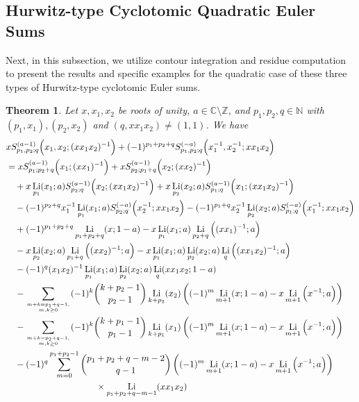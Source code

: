 \documentclass[11pt]{article}
\DeclareMathOperator{\Li}{Li}
\def\N{\mathbb{N}}
\def\Z{\mathbb{Z}}
\theoremstyle{plain}
\newtheorem{thm}{Theorem}[section]
\theoremstyle{definition}
\begin{document}
\subsection{Hurwitz-type Cyclotomic Quadratic Euler Sums}
Next, in this subsection, we utilize contour integration and residue computation to present the results and specific examples for the quadratic case of these three types of Hurwitz-type cyclotomic Euler sums.
\begin{thm}\label{thm-quadratic-CES-one} Let $x,x_1,x_2$ be roots of unity, $a\in \mathbb{C}\setminus \Z$, and $p_1,p_2,q\in\N$ with $(p_1,x_1), (p_2,x_2) $ and $ (q,xx_1x_2)\neq (1,1)$. We have
\begin{align}
&x S_{p_1,p_2;q}^{(a-1)}\Big(x_1,x_2;(xx_1x_2)^{-1}\Big)+(-1)^{p_1+p_2+q} S_{p_1,p_2;q}^{(-a)}\Big(x_1^{-1},x_2^{-1};xx_1x_2\Big)\nonumber\\
&=x S_{p_1;p_2+q}^{(a-1)}\Big(x_1;(xx_1)^{-1}\Big)+x S_{p_2;p_1+q}^{(a-1)}\Big(x_2;(xx_2)^{-1}\Big)\nonumber\\
&\quad+x\Li_{p_1}(x_1;a)S_{p_2;q}^{(a-1)}\Big(x_2;(xx_1x_2)^{-1}\Big)+x\Li_{p_2}(x_2;a)S_{p_1;q}^{(a-1)}\Big(x_1;(xx_1x_2)^{-1}\Big)\nonumber\\
&\quad-(-1)^{p_2+q}x_1^{-1}\Li_{p_1}(x_1;a)S_{p_2;q}^{(-a)}\Big(x_2^{-1};xx_1x_2\Big)-(-1)^{p_1+q}x_2^{-1}\Li_{p_2}(x_2;a)S_{p_1;q}^{(-a)}\Big(x_1^{-1};xx_1x_2\Big)\nonumber\\
&\quad+(-1)^{p_1+p_2+q}\Li_{p_1+p_2+q}(x;1-a)-x \Li_{p_1}(x_1;a)\Li_{p_2+q}\Big((xx_1)^{-1};a\Big)\nonumber\\&\quad-x \Li_{p_2}(x_2;a)\Li_{p_1+q}\Big((xx_2)^{-1};a\Big)-x\Li_{p_1}(x_1;a)\Li_{p_2}(x_2;a)\Li_q\Big((xx_1x_2)^{-1};a\Big)\nonumber\\
&\quad-(-1)^q(x_1x_2)^{-1}\Li_{p_1}(x_1;a)\Li_{p_2}(x_2;a)\Li_q(xx_1x_2;1-a)\nonumber\\
&\quad-\sum_{m+k=p_1+q-1,\atop m,k\geq 0} (-1)^k \binom{k+p_2-1}{p_2-1}\Li_{k+p_2}(x_2)\left((-1)^m\Li_{m+1}(x;1-a)-x \Li_{m+1}\Big(x^{-1};a\Big)\right)\nonumber\\
&\quad-\sum_{m+k=p_2+q-1,\atop m,k\geq 0} (-1)^k \binom{k+p_1-1}{p_1-1}\Li_{k+p_1}(x_1)\left((-1)^m\Li_{m+1}(x;1-a)-x \Li_{m+1}\Big(x^{-1};a\Big)\right)\nonumber\\
&\quad-(-1)^q\sum_{m=0}^{p_1+p_2-1}\binom{p_1+p_2+q-m-2}{q-1}\left((-1)^m\Li_{m+1}(x;1-a)-x \Li_{m+1}\Big(x^{-1};a\Big)\right)\nonumber\\&\qquad\qquad\qquad\qquad\qquad\times \Li_{p_1+p_2+q-m-1}(xx_1x_2)\nonumber\\

\end{align}
\end{thm}
\end{document}
